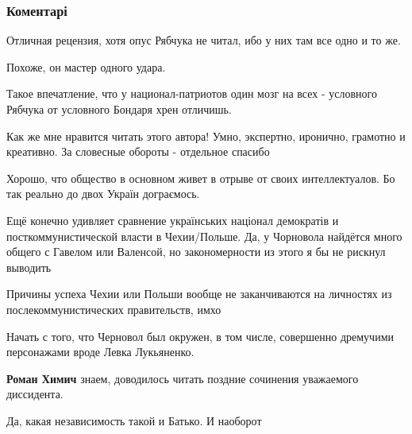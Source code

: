  
 
 
 
 
\subsubsection{Коментарі}
\label{sec:10_09_2020.fb.himich_roman.1.rjabchuk_statja_malorossia.cmt}

\begin{itemize} %
Отличная рецензия, хотя опус Рябчука не читал, ибо у них там все одно и то же.

\begin{itemize} %
Похоже, он мастер одного удара.

Такое впечатление, что у национал-патриотов один мозг на всех - условного Рябчука от условного Бондаря хрен отличишь.
\end{itemize} %


Как же мне нравится читать этого автора! Умно, экспертно, иронично, грамотно и
креативно. За словесные обороты - отдельное спасибо



Хорошо, что общество в основном живет в отрыве от своих интеллектуалов. Бо так
реально до двох Україн дограємось.

Ещё конечно удивляет сравнение українських націонал демократів и
посткоммунистической власти в Чехии/Польше. Да, у Чорновола найдётся много
общего с Гавелом или Валенсой, но закономерности из этого я бы не рискнул
выводить

Причины успеха Чехии или Польши вообще не заканчиваются на личностях из
послекоммунистических правительств, имхо

\begin{itemize} %
Начать с того, что Черновол был окружен, в том числе, совершенно дремучими персонажами вроде Левка Лукьяненко.

\textbf{Роман Химич} знаем, доводилось читать поздние сочинения уважаемого диссидента.

Да, какая независимость такой и Батько. И наоборот


\end{itemize}
\end{itemize}
